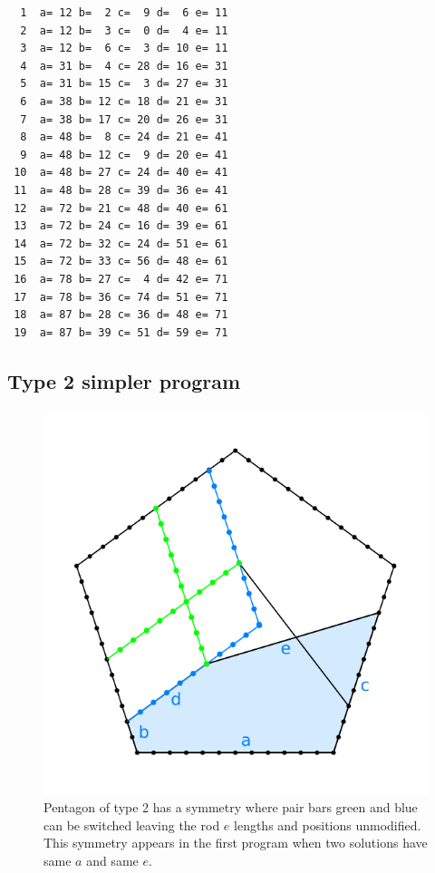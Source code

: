 \documentclass[11pt]{article}
\begin{document}
\begin{lstlisting}
  1  a= 12 b=  2 c=  9 d=  6 e= 11
  2  a= 12 b=  3 c=  0 d=  4 e= 11
  3  a= 12 b=  6 c=  3 d= 10 e= 11
  4  a= 31 b=  4 c= 28 d= 16 e= 31
  5  a= 31 b= 15 c=  3 d= 27 e= 31
  6  a= 38 b= 12 c= 18 d= 21 e= 31
  7  a= 38 b= 17 c= 20 d= 26 e= 31
  8  a= 48 b=  8 c= 24 d= 21 e= 41
  9  a= 48 b= 12 c=  9 d= 20 e= 41
 10  a= 48 b= 27 c= 24 d= 40 e= 41
 11  a= 48 b= 28 c= 39 d= 36 e= 41
 12  a= 72 b= 21 c= 48 d= 40 e= 61
 13  a= 72 b= 24 c= 16 d= 39 e= 61
 14  a= 72 b= 32 c= 24 d= 51 e= 61
 15  a= 72 b= 33 c= 56 d= 48 e= 61
 16  a= 78 b= 27 c=  4 d= 42 e= 71
 17  a= 78 b= 36 c= 74 d= 51 e= 71
 18  a= 87 b= 28 c= 36 d= 48 e= 71
 19  a= 87 b= 39 c= 51 d= 59 e= 71
\end{lstlisting}


\subsection{Type 2 simpler program}

\begin{figure}[htpb]
\centering
\includegraphics[scale=0.75]{figs/type-2-double}
\caption{Pentagon of type 2 has a symmetry where pair bars green and blue can be switched leaving
the rod $e$ lengths and positions unmodified. This symmetry appears in the first program when two solutions have same $a$ and same $e$.}
\label{fig:type-2-double}
\end{figure}
\end{document}
